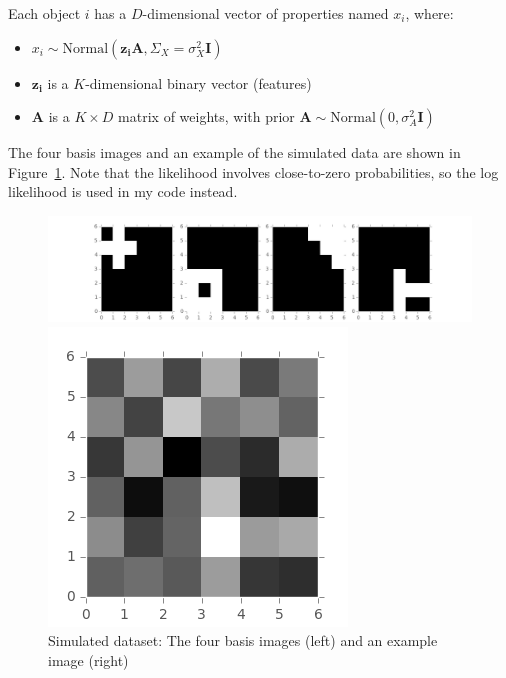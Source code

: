 Each object $i$ has a $D$-dimensional vector of properties named $x_i$, where:
\begin{itemize}
\item $x_i \sim \text{Normal}(\mathbf{z_i} \mathbf{A}, \Sigma_X = \sigma_X^2\mathbf{I})$
\item $\mathbf{z_i}$ is a $K$-dimensional binary vector (features)
\item $\mathbf{A}$ is a $K \times D$ matrix of weights, with prior $\mathbf{A} \sim \text{Normal}(0,\sigma_A^2 \mathbf{I})$
\end{itemize}

The four basis images and an example of the simulated data are shown in Figure~\ref{fig:images}. Note that the likelihood involves close-to-zero probabilities, so the log likelihood is used in my code instead.

\begin{figure}[!ht]
\centering
    \begin{minipage}{0.8\linewidth}
    \includegraphics[width=\linewidth]{basis_images.png}
    \end{minipage}%
    \begin{minipage}{0.2\linewidth}
    \includegraphics[width=\linewidth]{example_image.png}
    \end{minipage}
    \caption{Simulated dataset: The four basis images (left) and an example image (right)}
    \label{fig:images}
\end{figure}

